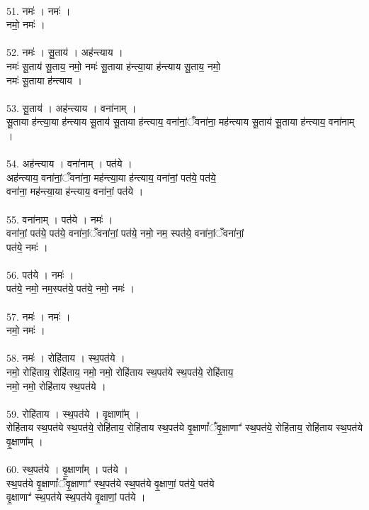 \\
51. नमः॑ । नमः॑ ।\\
नमो॒ नमः॑ ।\\
\\
52. नमः॑ । सू॒ताय॑ । अह॑न्त्याय ।\\
नमः॑ सू॒ताय॑ सू॒ताय॒ नमो॒ नमः॑ सू॒ताया ह॑न्त्या॒या ह॑न्त्याय सू॒ताय॒ नमो॒\\
नमः॑ सू॒ताया ह॑न्त्याय ।\\
\\
53. सू॒ताय॑ । अह॑न्त्याय । वना॑नाम् ।\\
सू॒ताया ह॑न्त्या॒या ह॑न्त्याय सू॒ताय॑ सू॒ताया ह॑न्त्याय॒ वना॑नां॒ँवना॑ना॒ मह॑न्त्याय सू॒ताय॑ सू॒ताया ह॑न्त्याय॒ वना॑नाम् ।\\
\\
54. अह॑न्त्याय । वना॑नाम् । पत॑ये ।\\
अह॑न्त्याय॒ वना॑नां॒ँवना॑ना॒ मह॑न्त्या॒या ह॑न्त्याय॒ वना॑नां॒ पत॑ये॒ पत॑ये॒\\
वना॑ना॒ मह॑न्त्या॒या ह॑न्त्याय॒ वना॑नां॒ पत॑ये ।\\
\\
55. वना॑नाम् । पत॑ये । नमः॑ ।\\
वना॑नां॒ पत॑ये॒ पत॑ये॒ वना॑नां॒ँवना॑नां॒ पत॑ये॒ नमो॒ नम॒ स्पत॑ये॒ वना॑नां॒ँवना॑नां॒\\
पत॑ये॒ नमः॑ ।\\
\\
56. पत॑ये । नमः॑ ।\\
पत॑ये॒ नमो॒ नम॒स्पत॑ये॒ पत॑ये॒ नमो॒ नमः॑ ।\\
\\
57. नमः॑ । नमः॑ ।\\
नमो॒ नमः॑ ।\\
\\
58. नमः॑ । रोहि॑ताय । स्थ॒पत॑ये ।\\
नमो॒ रोहि॑ताय॒ रोहि॑ताय॒ नमो॒ नमो॒ रोहि॑ताय स्थ॒पत॑ये स्थ॒पत॑ये॒ रोहि॑ताय॒\\
नमो॒ नमो॒ रोहि॑ताय स्थ॒पत॑ये ।\\
\\
59. रोहि॑ताय । स्थ॒पत॑ये । वृ॒क्षाणा᳚म् ।\\
रोहि॑ताय स्थ॒पत॑ये स्थ॒पत॑ये॒ रोहि॑ताय॒ रोहि॑ताय स्थ॒पत॑ये वृ॒क्षाणां᳚ँवृ॒क्षाणाꣲ॑ स्थ॒पत॑ये॒ रोहि॑ताय॒ रोहि॑ताय स्थ॒पत॑ये वृ॒क्षाणा᳚म् ।\\
\\
60. स्थ॒पत॑ये । वृ॒क्षाणा᳚म् । पत॑ये ।\\
स्थ॒पत॑ये वृ॒क्षाणां᳚ँवृ॒क्षाणाꣲ॑ स्थ॒पत॑ये स्थ॒पत॑ये वृ॒क्षाणां॒ पत॑ये॒ पत॑ये\\
वृ॒क्षाणाꣲ॑ स्थ॒पत॑ये स्थ॒पत॑ये वृ॒क्षाणां॒ पत॑ये ।\\
